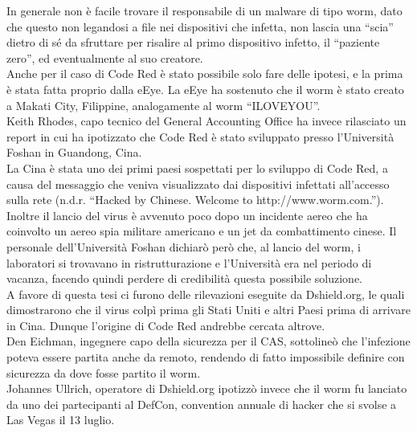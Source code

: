 In generale non è facile trovare il responsabile di un malware di tipo worm, dato che questo non legandosi a file nei dispositivi che infetta, non lascia una “scia” dietro di sé da sfruttare per risalire al primo dispositivo infetto, il “paziente zero”, ed eventualmente al suo creatore.\\
Anche per il caso di Code Red è stato possibile solo fare delle ipotesi, e la prima è stata fatta proprio dalla eEye.
La eEye ha sostenuto che il worm è stato creato a Makati City, Filippine, analogamente al worm “ILOVEYOU”.\\ 
Keith Rhodes, capo tecnico del General Accounting Office ha invece rilasciato un report in cui ha ipotizzato che Code Red è stato sviluppato presso l’Università Foshan in Guandong, Cina.\\
La Cina è stata uno dei primi paesi sospettati per lo sviluppo di Code Red, a causa del messaggio che veniva visualizzato dai dispositivi infettati all’accesso sulla rete (n.d.r. “Hacked by Chinese. Welcome to http://www.worm.com.”). Inoltre il lancio del virus è avvenuto poco dopo un incidente aereo che ha coinvolto un aereo spia militare americano e un jet da combattimento cinese.
Il personale dell’Università Foshan dichiarò però che, al lancio del worm, i laboratori si trovavano in ristrutturazione e l’Università era nel periodo di vacanza, facendo quindi perdere di credibilità questa possibile soluzione.\\
A favore di questa tesi ci furono delle rilevazioni eseguite da Dshield.org, le quali dimostrarono che il virus colpì prima gli Stati Uniti e altri Paesi prima di arrivare in Cina. Dunque l’origine di Code Red andrebbe cercata altrove.\\
Den Eichman, ingegnere capo della sicurezza per il CAS, sottolineò che l’infezione poteva essere partita anche da remoto, rendendo di fatto impossibile definire con sicurezza da dove fosse partito il worm.\\
Johannes Ullrich, operatore di Dshield.org ipotizzò invece che il worm fu lanciato da uno dei partecipanti al DefCon, convention annuale di hacker che si svolse a Las Vegas il 13 luglio.\\
